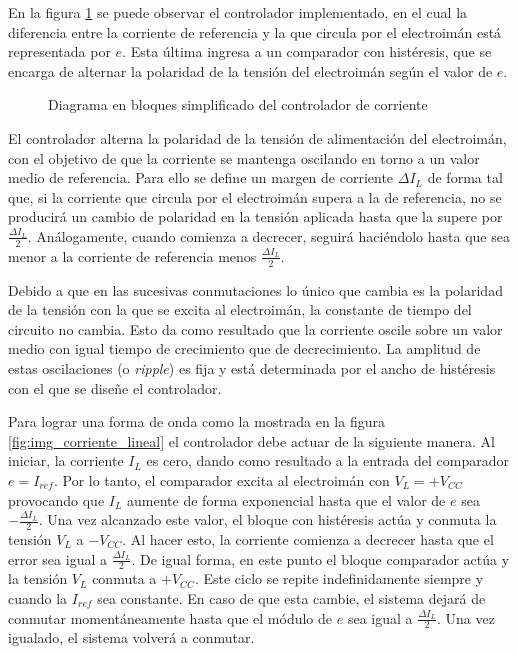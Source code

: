 En la figura \ref{fig:img_diag-en-bloques} se puede observar el controlador implementado, en el cual la diferencia entre la corriente de referencia y la que circula por el electroimán está representada por $e$. Esta última ingresa a un comparador con histéresis, que se encarga de alternar la polaridad de la tensión del electroimán según el valor de $e$.


\begin{figure}[H]
	\centering
	
	\caption{Diagrama en bloques simplificado del controlador de corriente}	\label{fig:img_diag-en-bloques}
\end{figure}

El controlador alterna la polaridad de la tensión de alimentación del electroimán, con el objetivo de que la corriente se mantenga oscilando en torno a un valor medio de referencia. Para ello se define un margen de corriente $\Delta I_L$ de forma tal que, si la corriente que circula por el electroimán supera a la de referencia, no se producirá un cambio de polaridad en la tensión aplicada hasta que la supere por $\frac{\Delta I_L}{2}$. Análogamente, cuando comienza a decrecer, seguirá haciéndolo hasta que sea menor a la corriente de referencia menos $\frac{\Delta I_L}{2}$.

Debido a que en las sucesivas conmutaciones lo único que cambia es la polaridad de la tensión con la que se excita al electroimán, la constante de tiempo del circuito no cambia. Esto da como resultado que la corriente oscile sobre un valor medio con igual tiempo de crecimiento que de decrecimiento. La amplitud de estas oscilaciones (o \textsl{ripple}) es fija y está determinada por el ancho de histéresis con el que se diseñe el controlador.

Para lograr una forma de onda como la mostrada en la  figura \ref{fig:img_corriente_lineal} el controlador debe actuar de la siguiente manera. Al iniciar, la corriente $I_L$ es cero, dando como resultado a la entrada del comparador  $e = I_{ref}$. Por lo tanto, el comparador excita al electroimán con $V_L=+V_{CC}$ provocando que $I_L$ aumente de forma exponencial hasta que el valor de $e$ sea $-\frac{\Delta I_L}{2}$. Una vez alcanzado este valor, el bloque con histéresis actúa y conmuta la tensión $V_L$ a $-V_{CC}$. Al hacer esto, la corriente comienza a decrecer hasta que el error sea igual a $\frac{\Delta I_L}{2}$. De igual forma, en este punto el bloque comparador actúa y la tensión $V_L$ conmuta a $+V_{CC}$. Este ciclo se repite indefinidamente siempre y cuando la $I_{ref}$ sea constante. En caso de que esta cambie, el sistema dejará de conmutar momentáneamente hasta que el módulo de $e$ sea igual a $\frac{\Delta I_L}{2}$. Una vez igualado, el sistema volverá a conmutar.


